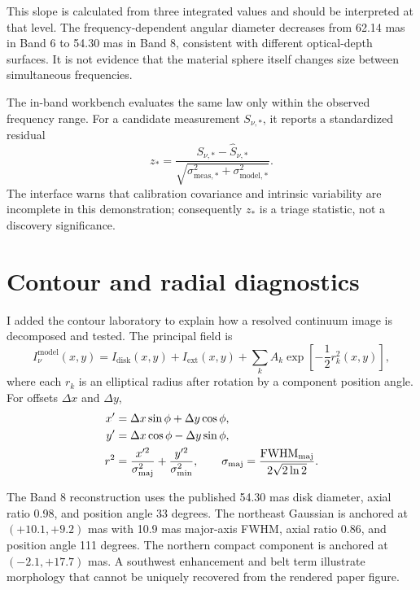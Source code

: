 \documentclass[11pt,a4paper]{article}
\begin{document}
This slope is calculated from three integrated values and should be interpreted at that level. The frequency-dependent angular diameter decreases from 62.14 mas in Band 6 to 54.30 mas in Band 8, consistent with different optical-depth surfaces. It is not evidence that the material sphere itself changes size between simultaneous frequencies.

The in-band workbench evaluates the same law only within the observed frequency range. For a candidate measurement $S_{\nu,*}$, it reports a standardized residual
\begin{equation}
z_* = \frac{S_{\nu,*}-\widehat{S}_{\nu,*}}
{\sqrt{\sigma_{\mathrm{meas},*}^{2}+\sigma_{\mathrm{model},*}^{2}}}.
\end{equation}
The interface warns that calibration covariance and intrinsic variability are incomplete in this demonstration; consequently $z_*$ is a triage statistic, not a discovery significance.

\section{Contour and radial diagnostics}

I added the contour laboratory to explain how a resolved continuum image is decomposed and tested. The principal field is
\begin{equation}
I_\nu^{\mathrm{model}}(x,y)=I_{\mathrm{disk}}(x,y)+I_{\mathrm{ext}}(x,y)
+\sum_k A_k\exp\left[-\frac{1}{2}r_k^2(x,y)\right],
\end{equation}
where each $r_k$ is an elliptical radius after rotation by a component position angle. For offsets $\Delta x$ and $\Delta y$,
\begin{align}
x' &= \Delta x\sin\phi + \Delta y\cos\phi,\\
y' &= \Delta x\cos\phi - \Delta y\sin\phi,\\
r^2 &= \frac{x'^2}{\sigma_{\rm maj}^2}+\frac{y'^2}{\sigma_{\rm min}^2},
\qquad \sigma_{\rm maj}=\frac{\mathrm{FWHM}_{\rm maj}}{2\sqrt{2\ln2}}.
\end{align}

The Band 8 reconstruction uses the published 54.30 mas disk diameter, axial ratio 0.98, and position angle 33 degrees. The northeast Gaussian is anchored at $(+10.1,+9.2)$ mas with 10.9 mas major-axis FWHM, axial ratio 0.86, and position angle 111 degrees. The northern compact component is anchored at $(-2.1,+17.7)$ mas. A southwest enhancement and belt term illustrate morphology that cannot be uniquely recovered from the rendered paper figure.
\end{document}
